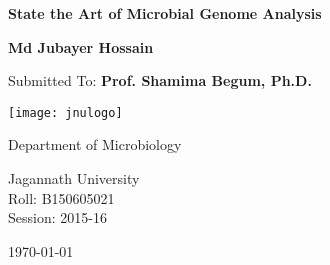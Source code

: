 
\begin{titlepage}	
	\centering 	
	{\LARGE \bfseries State the Art of Microbial Genome Analysis}
	\vspace{3\baselineskip}
	
	{\Huge \bfseries Md Jubayer Hossain}
	\vspace{3\baselineskip}
	
	{\Large Submitted To: \bfseries Prof. Shamima Begum, Ph.D.}
	\vspace{3\baselineskip}
	
	\texttt{[image: jnulogo]}
	\vspace{3\baselineskip}
	
	{\Large Department of Microbiology} 
	\vspace{0.5\baselineskip}
	
	{\Large Jagannath University} \\ 
	{\Large Roll: B150605021} \\ 
	{\Large Session: 2015-16}

	
	
	
	{\Large \today}    
	
\end{titlepage}		